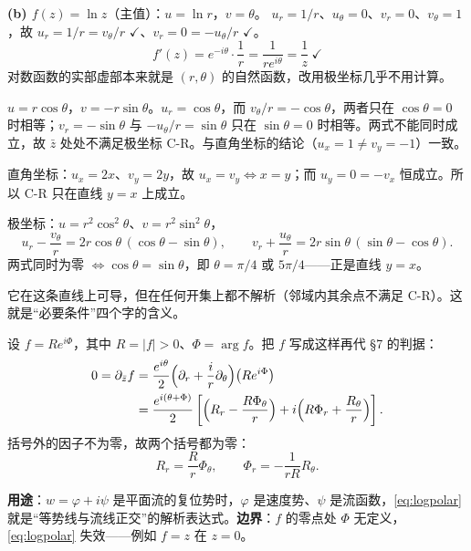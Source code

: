 \documentclass[11pt]{ctexart}
\newcommand{\chk}{\ensuremath{\checkmark}}
\let\origsubhdr\subhdr
\renewcommand{\subhdr}[1]{\par\needspace{4\baselineskip}\origsubhdr{#1}}
\begin{document}
\textbf{(b) $f(z)=\ln z$}（主值）：$u=\ln r$，$v=\theta$。
$u_r=1/r$、$u_\theta=0$、$v_r=0$、$v_\theta=1$，故 $u_r=1/r=v_\theta/r$ \chk、$v_r=0=-u_\theta/r$ \chk。
\[ f'(z)=e^{-i\theta}\cdot\frac1r=\frac{1}{re^{i\theta}}=\frac1z\ \chk \]
对数函数的实部虚部本来就是 $(r,\theta)$ 的自然函数，改用极坐标几乎不用计算。


$u=r\cos\theta$，$v=-r\sin\theta$。$u_r=\cos\theta$，而 $v_\theta/r=-\cos\theta$，两者只在 $\cos\theta=0$ 时相等；$v_r=-\sin\theta$ 与 $-u_\theta/r=\sin\theta$ 只在 $\sin\theta=0$ 时相等。两式不能同时成立，故 $\bar z$ 处处不满足极坐标 C-R。与直角坐标的结论（$u_x=1\neq v_y=-1$）一致。


直角坐标：$u_x=2x$、$v_y=2y$，故 $u_x=v_y\iff x=y$；而 $u_y=0=-v_x$ 恒成立。所以 C-R 只在直线 $y=x$ 上成立。

极坐标：$u=r^2\cos^2\theta$、$v=r^2\sin^2\theta$，
\[ u_r-\frac{v_\theta}{r}=2r\cos\theta\,(\cos\theta-\sin\theta),\qquad
v_r+\frac{u_\theta}{r}=2r\sin\theta\,(\sin\theta-\cos\theta). \]
两式同时为零 $\iff\cos\theta=\sin\theta$，即 $\theta=\pi/4$ 或 $5\pi/4$——正是直线 $y=x$。

它在这条直线上可导，但在任何开集上都不解析（邻域内其余点不满足 C-R）。这就是“必要条件”四个字的含义。


设 $f=Re^{i\Phi}$，其中 $R=|f|>0$、$\Phi=\arg f$。把 $f$ 写成这样再代 §7 的判据：
\begin{align*}
0=\partial_{\bar z}f&=\frac{e^{i\theta}}{2}\Bigl(\partial_r+\frac{i}{r}\partial_\theta\Bigr)\bigl(Re^{i\Phi}\bigr)\\
&=\frac{e^{i(\theta+\Phi)}}{2}\left[\Bigl(R_r-\frac{R\Phi_\theta}{r}\Bigr)
+i\Bigl(R\Phi_r+\frac{R_\theta}{r}\Bigr)\right].
\end{align*}
括号外的因子不为零，故两个括号都为零：
\begin{equation}\label{eq:logpolar}
R_r=\frac{R}{r}\Phi_\theta,\qquad \Phi_r=-\frac{1}{rR}R_\theta .
\end{equation}


\textbf{用途}：$w=\varphi+i\psi$ 是平面流的复位势时，$\varphi$ 是速度势、$\psi$ 是流函数，\eqref{eq:logpolar} 就是“等势线与流线正交”的解析表达式。\textbf{边界}：$f$ 的零点处 $\Phi$ 无定义，\eqref{eq:logpolar} 失效——例如 $f=z$ 在 $z=0$。
\end{document}
